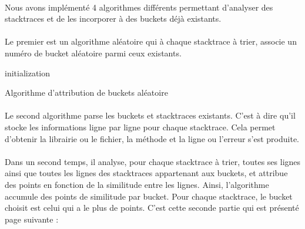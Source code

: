 \documentclass{article}
\begin{document}
\paragraph{}
Nous avons implémenté 4 algorithmes différents permettant d'analyser des stacktraces et de les incorporer à des buckets déjà existants. 

\paragraph{}
Le premier est un algorithme aléatoire qui à chaque stacktrace à trier, associe un numéro de bucket aléatoire parmi ceux existants.
~~\\

\IncMargin{1em}
\begin{algorithm}[H]
\SetAlgoLined
\DontPrintSemicolon
{}
 initialization\;
\caption{Algorithme d'attribution de buckets aléatoire}
\end{algorithm}

\paragraph{}
Le second algorithme parse les buckets et stacktraces existants. C'est à dire qu'il stocke les informations ligne par ligne pour chaque stacktrace. Cela permet d'obtenir la librairie ou le fichier, la méthode et la ligne ou l'erreur s'est produite.

\paragraph{}
Dans un second temps, il analyse, pour chaque stacktrace à trier, toutes ses lignes ainsi que toutes les lignes des stacktraces appartenant aux buckets, et attribue des points en fonction de la similitude entre les lignes. Ainsi, l'algorithme accumule des points de similitude par bucket. Pour chaque stacktrace, le bucket choisit est celui qui a le plus de points.
C'est cette seconde partie qui est présenté page suivante :
~~\\
\end{document}
